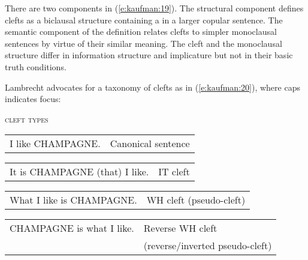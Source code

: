 \documentclass[output=paper]{langsci/langscibook}
\begin{document}
\noindent
There are two components in (\ref{e:kaufman:19}). The structural component defines clefts as a biclausal structure containing a  in a larger copular sentence. The semantic component of the definition relates clefts to simpler monoclausal sentences by virtue of their similar meaning. The cleft and the monoclausal structure differ in information structure and implicature but not in their basic truth conditions. 

Lambrecht advocates for a taxonomy of  clefts as in (\ref{e:kaufman:20}), where caps indicates focus:


\begin{exe}
	\ex\label{e:kaufman:20} \textsc{cleft types} \citep[467]{Lambrecht:2001}
	\begin{xlist}
		\ex\label{e:kaufman:20a} 
		\begin{tabular}[t]{L{4.5cm}l}
		I like CHAMPAGNE.& Canonical sentence
		\end{tabular}
		\ex\label{e:kaufman:20b} 
		\begin{tabular}[t]{L{4.5cm}l}
		It is CHAMPAGNE (that) I like.& IT cleft
		\end{tabular}
		\ex\label{e:kaufman:20c} 
		\begin{tabular}[t]{L{4.5cm}l}
		What I like is CHAMPAGNE.& WH cleft (pseudo-cleft)
		\end{tabular}
		\ex\label{e:kaufman:20d} 
		\begin{tabular}[t]{L{4.5cm}l}
		CHAMPAGNE is what I like.& Reverse WH cleft\\
		&(reverse/inverted pseudo-cleft)
		\end{tabular}
	\end{xlist}
\end{exe}
\end{document}

